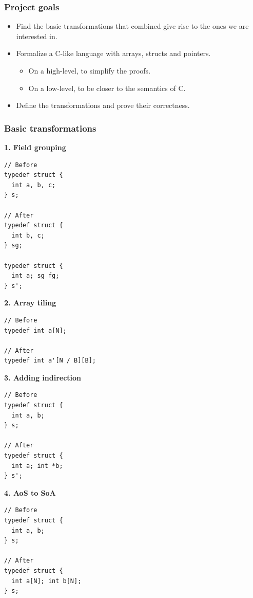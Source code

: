 \begin{frame}[fragile]
\frametitle{Project goals}

\begin{itemize}
	\setlength\itemsep{1.5em}
	\item Find the basic transformations that combined give rise to the ones we are interested in.\\ \pause
	\item Formalize a C-like language with arrays, structs and pointers.
	\begin{itemize}
		\item On a high-level, to simplify the proofs.
		\item On a low-level, to be closer to the semantics of C.
	\end{itemize} \pause
	\item Define the transformations and prove their correctness.
\end{itemize}

\end{frame}


\begin{frame}[fragile]
\frametitle{Basic transformations}

\begin{center}
\begin{minipage}{0.45\linewidth}
\textbf{\small 1. Field grouping}
\begin{lstlisting}[style=Cstyle, basicstyle=\scriptsize]
// Before
typedef struct {
  int a, b, c;
} s;

// After
typedef struct {
  int b, c;
} sg;

typedef struct {
  int a; sg fg;
} s';
\end{lstlisting}
\textbf{\small 2. Array tiling}
\begin{lstlisting}[style=Cstyle, basicstyle=\scriptsize]
// Before
typedef int a[N];

// After
typedef int a'[N / B][B];
\end{lstlisting}
\end{minipage}%
\begin{minipage}{0.45\linewidth}
\textbf{\small 3. Adding indirection}
\begin{lstlisting}[style=Cstyle, basicstyle=\scriptsize]
// Before
typedef struct {
  int a, b;
} s;

// After
typedef struct {
  int a; int *b;
} s';
\end{lstlisting}
\textbf{\small 4. AoS to SoA}
\begin{lstlisting}[style=Cstyle, basicstyle=\scriptsize]
// Before
typedef struct {
  int a, b;
} s;

// After
typedef struct {
  int a[N]; int b[N];
} s;
\end{lstlisting}
\end{minipage}
\end{center}

\end{frame}


